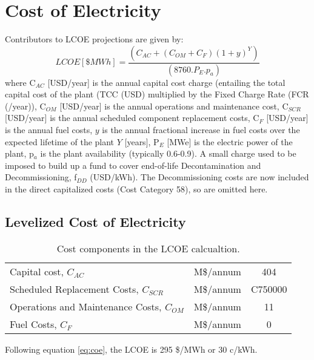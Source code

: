 \newpage 

\section{Cost of Electricity} 

 Contributors to LCOE projections are given by: 
 \begin{equation} 
 LCOE [\$ MWh] = \frac{(C_{AC} + (C_{OM} + C_{F})(1+y)^Y)}{(8760.P_E.p_a)} 
 \label{eq:coe}
\end{equation} 
where C$_{AC}$ [USD/year] is the annual capital cost charge (entailing the total capital cost of the plant (TCC (USD) multiplied by the Fixed Charge Rate (FCR (/year)), C$_{OM}$ [USD/year] is the annual operations and maintenance cost, C$_{SCR}$ [USD/year] is the annual scheduled component replacement costs, C$_{F}$ [USD/year] is the annual fuel costs, $y$ is the annual fractional increase in fuel costs over the expected lifetime of the plant $Y$ [years], P$_{E}$ [MWe] is the electric power of the plant, p$_{a}$ is the plant availability (typically 0.6-0.9).  A small charge used to be imposed to build up a fund to cover end-of-life Decontamination and Decommissioning, f$_{DD}$ (USD/kWh).  The Decommissioning costs are now included in the direct capitalized costs (Cost Category 58), so are omitted here.







\subsection{Levelized Cost of Electricity} 

\begin{table}[h!] 
\begin{tabular}{l c c } 
Capital cost, $C_{AC}$ &     M\$/annum    &    404      \\ 
Scheduled Replacement Costs, $C_{SCR}$  &     M\$/annum    &  C750000   \\ 
Operations and Maintenance Costs, $C_{OM}$ & M\$/annum  &      11 \\ 
Fuel Costs, $C_{F}$ & M\$/annum  &       0 \\ 
    \end{tabular} 
    \caption{Cost components in the LCOE calcualtion.}
    \label{tab:lcoe} 
\end{table} 

Following equation \ref{eq:coe}, the LCOE is 295 \$/MWh or 30 c/kWh. 

